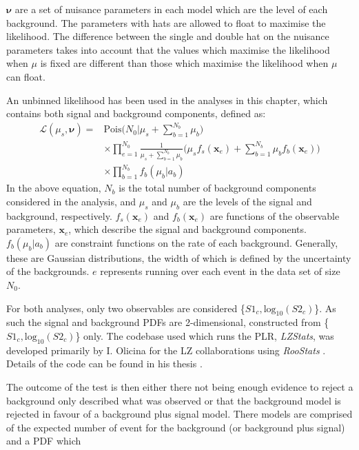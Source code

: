 $\boldsymbol{\nu}$ are a set of nuisance parameters in each model which are the level of each background.
The parameters with hats are allowed to float to maximise the likelihood.
The difference between the single and double hat on the nuisance parameters takes into account that the values which maximise the likelihood when $\mu$ is fixed are different than those which maximise the likelihood when $\mu$ can float.
\par
An unbinned likelihood has been used in the analyses in this chapter, which contains both signal and background components, defined as:
\begin{equation}
\begin{split}
    \mathcal{L}(\mu_s,\boldsymbol{\nu}) =& \text{Pois} \bigg(N_0 | \mu_s + \sum^{N_b}_{b=1} \mu_b \bigg) \\
                                         & \times \prod^{N_0}_{e=1} \frac{1}{\mu_s + \sum^{N_b}_{b=1} \mu_b} \bigg( \mu_s f_s (\boldsymbol{x}_e) + \sum^{N_b}_{b=1} \mu_b f_b(\boldsymbol{x}_e) \bigg) \\
                                         & \times \prod^{N_b}_{b=1} f_b(\mu_b | a_b)
\end{split}
\end{equation}
In the above equation, $N_b$ is the total number of background components considered in the analysis, and $\mu_s$ and $\mu_b$ are the levels of the signal and background, respectively. 
$f_s(\boldsymbol{x}_e)$ and $f_b(\boldsymbol{x}_e)$ are functions of the observable parameters,  $\boldsymbol{x}_e$, which describe the signal and background components.
$f_b(\mu_b | a_b)$ are constraint functions on the rate of each background.
Generally, these are Gaussian distributions, the width of which is defined by the uncertainty of the backgrounds.
$e$ represents running over each event in the data set of size $N_0$.

\par
For both analyses, only two observables are considered \{$S1_c,\text{log}_{10}(S2_c)$\}.
As such the signal and background PDFs are 2-dimensional, constructed from \{$S1_c,\text{log}_{10}(S2_c)$\} only.
The codebase used which runs the PLR, \textit{LZStats}, was developed primarily by I. Olicina for the LZ collaborations using \textit{RooStats} \cite{roostats_ref}.
Details of the code can be found in his thesis \cite{LZ_Ibles_LZStats_Thesis_ref}.


\iffalse
The outcome of the test is then either there not being enough evidence to reject a background only described what was observed or that the background model is rejected in favour of a background plus signal model.
There models are comprised of the expected number of event for the background (or background plus signal) and a PDF which 


